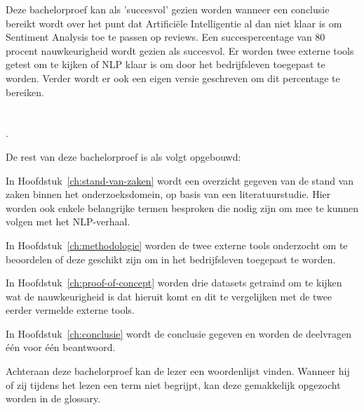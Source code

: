 Deze bachelorproef kan als 'succesvol' gezien worden wanneer een conclusie bereikt wordt over het punt dat Artificiële Intelligentie al dan niet klaar is om Sentiment Analysis toe te passen op reviews. Een succespercentage van 80 procent nauwkeurigheid wordt gezien als succesvol. Er worden twee externe tools getest om te kijken of NLP klaar is om door het bedrijfsleven toegepast te worden. Verder wordt er ook een eigen versie geschreven om dit percentage te bereiken.

\section{}
\label{sec:opzet-bachelorproef}.

De rest van deze bachelorproef is als volgt opgebouwd:

In Hoofdstuk~\ref{ch:stand-van-zaken} wordt een overzicht gegeven van de stand van zaken binnen het onderzoeksdomein, op basis van een literatuurstudie. Hier worden ook enkele belangrijke termen besproken die nodig zijn om mee te kunnen volgen met het NLP-verhaal.

In Hoofdstuk~\ref{ch:methodologie} worden de twee externe tools onderzocht om te beoordelen of deze geschikt zijn om in het bedrijfsleven toegepast te worden.

In Hoofdstuk~\ref{ch:proof-of-concept} worden drie datasets getraind om te kijken wat de nauwkeurigheid is dat hieruit komt en dit te vergelijken met de twee eerder vermelde externe tools.

In Hoofdstuk~\ref{ch:conclusie} wordt de conclusie gegeven en worden de deelvragen één voor één beantwoord. 

Achteraan deze bachelorproef kan de lezer een woordenlijst vinden. Wanneer hij of zij tijdens het lezen een term niet begrijpt, kan deze gemakkelijk opgezocht worden in de glossary.